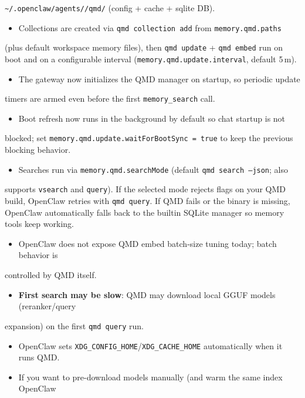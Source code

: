 \texttt{\textasciitilde{}/.openclaw/agents//qmd/} (config + cache + sqlite DB).
\begin{itemize}
  \item Collections are created via \texttt{qmd collection add} from \texttt{memory.qmd.paths}
\end{itemize}

(plus default workspace memory files), then \texttt{qmd update} + \texttt{qmd embed} run
on boot and on a configurable interval (\texttt{memory.qmd.update.interval},
default 5 m).
\begin{itemize}
  \item The gateway now initializes the QMD manager on startup, so periodic update
\end{itemize}

timers are armed even before the first \texttt{memory\_search} call.
\begin{itemize}
  \item Boot refresh now runs in the background by default so chat startup is not
\end{itemize}

blocked; set \texttt{memory.qmd.update.waitForBootSync = true} to keep the previous
blocking behavior.
\begin{itemize}
  \item Searches run via \texttt{memory.qmd.searchMode} (default \texttt{qmd search --json}; also
\end{itemize}

supports \texttt{vsearch} and \texttt{query}). If the selected mode rejects flags on your
QMD build, OpenClaw retries with \texttt{qmd query}. If QMD fails or the binary is
missing, OpenClaw automatically falls back to the builtin SQLite manager so
memory tools keep working.
\begin{itemize}
  \item OpenClaw does not expose QMD embed batch-size tuning today; batch behavior is
\end{itemize}

controlled by QMD itself.
\begin{itemize}
  \item \textbf{First search may be slow}: QMD may download local GGUF models (reranker/query
\end{itemize}

expansion) on the first \texttt{qmd query} run.
\begin{itemize}
  \item OpenClaw sets \texttt{XDG\_CONFIG\_HOME}/\texttt{XDG\_CACHE\_HOME} automatically when it runs QMD.
  \item If you want to pre-download models manually (and warm the same index OpenClaw
\end{itemize}

